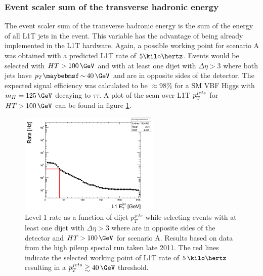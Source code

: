 \subsubsection{Event scaler sum of the transverse hadronic energy}


The event scaler sum of the transverse hadronic energy is the sum of the energy of all \gls{L1T} jets in the event. This variable has the advantage of being already implemented in the \gls{L1T} hardware. Again, a possible working point for scenario A was obtained with a predicted \gls{L1T} rate of $5\kilo\hertz$. Events would be selected with $HT>100\,\GeV$ and with at least one dijet with $\Delta\eta>3$ where both jets have $p_T \sim 40\,\GeV$ and are in opposite sides of the detector. The expected signal efficiency was calculated to be $\approx 98\%$ for a \gls{SM} \gls{VBF} Higgs with $m_H=125\,\GeV$ decaying to $\tau\tau$. A plot of the scan over \gls{L1T} $p_{\mathrm{T}}^{jets}$ for $HT>100\,\GeV$ can be found in figure \ref{FIGURE:ParkedDataAnalysis_ParkedTriggerDevelopment_PU28_5e33_RateFBDijetDEtaDPhi00HT100}.

\begin{figure}[ht]
\centering
\includegraphics[width=0.60\textwidth]{Chapter07/ParkedDataTriggerDevelopment/Images/PU28_5e33_RateFBDijetDEtaDPhi00HT100.png}
\caption{Level 1 rate as a function of dijet $p_T^{jets}$ while selecting events with at least one dijet with $\Delta\eta>3$ where are in opposite sides of the detector and $HT>100\,\GeV$ for scenario A. Results based on data from the high pileup special run taken late 2011. The red lines indicate the selected working point of \gls{L1T} rate of $5\,\kilo\hertz$ resulting in a $p_T^{jets} \gtrsim 40\,\GeV$ threshold.}
\label{FIGURE:ParkedDataAnalysis_ParkedTriggerDevelopment_PU28_5e33_RateFBDijetDEtaDPhi00HT100}
\end{figure}

